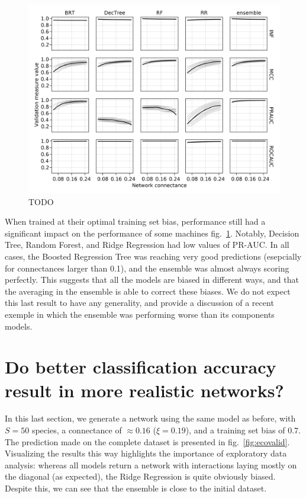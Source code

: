 \documentclass[11pt]{article}
\makeatletter
\def\maxwidth{\ifdim\Gin@nat@width>\linewidth\linewidth
\else\Gin@nat@width\fi}
\let\Oldincludegraphics\includegraphics
\renewcommand{\includegraphics}[1]{\Oldincludegraphics[width=\maxwidth]{#1}}
\makeatother
\begin{document}
\begin{figure}
\hypertarget{fig:optimperf}{%
\centering
\includegraphics{figures/optim_perf.png}
\caption{TODO}\label{fig:optimperf}
}
\end{figure}

When trained at their optimal training set bias, performance still had a
significant impact on the performance of some machines
fig.~\ref{fig:optimperf}. Notably, Decision Tree, Random Forest, and
Ridge Regression had low values of PR-AUC. In all cases, the Boosted
Regression Tree was reaching very good predictions (esepcially for
connectances larger than 0.1), and the ensemble was almost always
scoring perfectly. This suggests that all the models are biased in
different ways, and that the averaging in the ensemble is able to
correct these biases. We do not expect this last result to have any
generality, and provide a discussion of a recent exemple in which the
ensemble was performing worse than its components models.

\hypertarget{do-better-classification-accuracy-result-in-more-realistic-networks}{%
\section{Do better classification accuracy result in more realistic
networks?}\label{do-better-classification-accuracy-result-in-more-realistic-networks}}

In this last section, we generate a network using the same model as
before, with \(S = 50\) species, a connectance of \(\approx 0.16\)
(\(\xi = 0.19\)), and a training set bias of \(0.7\). The prediction
made on the complete dataset is presented in fig.~\ref{fig:ecovalid}.
Visualizing the results this way highlights the importance of
exploratory data analysis: whereas all models return a network with
interactions laying mostly on the diagonal (as expected), the Ridge
Regression is quite obviously biased. Despite this, we can see that the
ensemble is close to the initial dataset.
\end{document}
